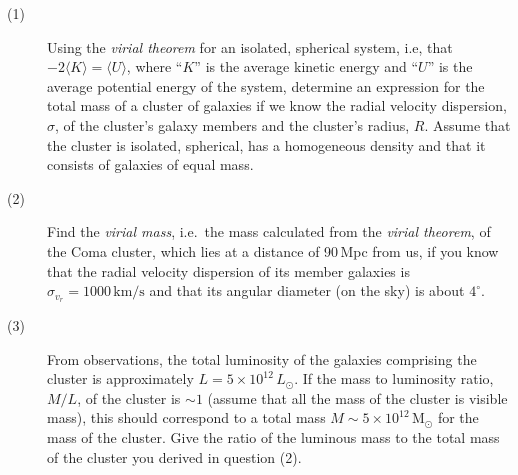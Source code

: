 \begin{description}
\item[(1)] Using the \emph{virial theorem} for an isolated, spherical system,
  i.e, that $-2\langle K\rangle = \langle U\rangle$, where ``$K$'' is the
  average kinetic energy and ``$U$'' is the average potential energy of the
  system, determine an expression for the total mass of a cluster of galaxies
  if we know the radial velocity dispersion, $\sigma$, of the cluster's galaxy
  members and the cluster's radius, $R$. Assume that the cluster is isolated,
  spherical, has a homogeneous density and that it consists of galaxies of
  equal mass.
\item[(2)] Find the \emph{virial mass}, i.e.\ the mass calculated from the
  \emph{virial theorem}, of the Coma cluster, which lies at a distance of
  90\,Mpc from us, if you know that the radial velocity dispersion of its
  member galaxies is $\sigma_{v_r} = 1000\,\mathrm{km/s}$ and that its angular
  diameter (on the sky) is about $4^\circ$.
\item[(3)] From observations, the total luminosity of the galaxies comprising
  the cluster is approximately $L = 5 \times 10^{12}\,L_\odot$. If the mass to
  luminosity ratio, $M/L$, of the cluster is ${\sim}1$ (assume that all the
  mass of the cluster is visible mass), this should correspond to a total mass
  $M \sim 5 \times 10^{12}\,\mathrm{M}_\odot$ for the mass of the cluster.
  Give the ratio of the luminous mass to the total mass of the cluster you
  derived in question (2).
\end{description}
